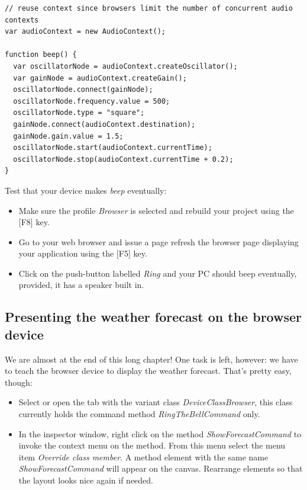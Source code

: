 \documentclass[
  a4paper,
,tablecaptionabove
]{scrbook}
\begin{document}
\begin{verbatim}
// reuse context since browsers limit the number of concurrent audio contexts
var audioContext = new AudioContext();

function beep() {
  var oscillatorNode = audioContext.createOscillator();
  var gainNode = audioContext.createGain();
  oscillatorNode.connect(gainNode);
  oscillatorNode.frequency.value = 500;
  oscillatorNode.type = "square";
  gainNode.connect(audioContext.destination);
  gainNode.gain.value = 1.5;
  oscillatorNode.start(audioContext.currentTime);
  oscillatorNode.stop(audioContext.currentTime + 0.2);
}
\end{verbatim}

Test that your device makes \emph{beep} eventually:

\begin{itemize}
\item
  Make sure the profile \emph{Browser} is selected and rebuild your
  project using the {[}F8{]} key.
\item
  Go to your web browser and issue a page refresh the browser page
  displaying your application using the {[}F5{]} key.
\item
  Click on the push-button labelled \emph{Ring} and your PC should beep
  eventually, provided, it has a speaker built in.
\end{itemize}

\hypertarget{_presenting_the_weather_forecast_on_the_browser_device}{%
\subsection{Presenting the weather forecast on the browser
device}\label{_presenting_the_weather_forecast_on_the_browser_device}}

We are almost at the end of this long chapter! One task is left,
however: we have to teach the browser device to display the weather
forecast. That's pretty easy, though:

\begin{itemize}
\item
  Select or open the tab with the variant class
  \emph{DeviceClassBrowser}, this class currently holds the command
  method \emph{RingTheBellCommand} only.
\item
  In the inspector window, right click on the method
  \emph{ShowForecastCommand} to invoke the context menu on the method.
  From this menu select the menu item \emph{Override class member}. A
  method element with the same name \emph{ShowForecastCommand} will
  appear on the canvas. Rearrange elements so that the layout looks nice
  again if needed.
\end{itemize}
\end{document}
